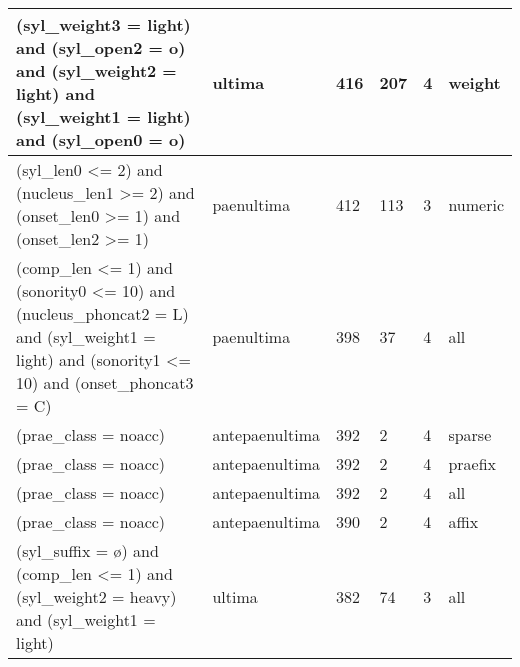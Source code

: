 \begin{table}
\begin{tabular}{|p{8cm}l|ll|ll|}
(syl\_weight3 = light) and (syl\_open2 = o) and (syl\_weight2 = light) and (syl\_weight1 = light) and (syl\_open0 = o)                                                                                                                                      & ultima         & 416 & 207 & 4 & weight    \\\hline
(syl\_len0 \textless= 2) and (nucleus\_len1 \textgreater= 2) and (onset\_len0 \textgreater= 1) and (onset\_len2 \textgreater= 1)                                                                                                                            & paenultima     & 412 & 113 & 3 & numeric   \\\hline
(comp\_len \textless= 1) and (sonority0 \textless= 10) and (nucleus\_phoncat2 = L) and (syl\_weight1 = light) and (sonority1 \textless= 10) and (onset\_phoncat3 = C)                                                                                       & paenultima     & 398 & 37  & 4 & all       \\\hline
(prae\_class = noacc)                                                                                                                                                                                                                                       & antepaenultima & 392 & 2   & 4 & sparse    \\\hline
(prae\_class = noacc)                                                                                                                                                                                                                                       & antepaenultima & 392 & 2   & 4 & praefix   \\\hline
(prae\_class = noacc)                                                                                                                                                                                                                                       & antepaenultima & 392 & 2   & 4 & all       \\\hline
(prae\_class = noacc)                                                                                                                                                                                                                                       & antepaenultima & 390 & 2   & 4 & affix     \\\hline
(syl\_suffix = ø) and (comp\_len \textless= 1) and (syl\_weight2 = heavy) and (syl\_weight1 = light)                                                                                                                                                        & ultima         & 382 & 74  & 3 & all       \\\hline

\end{tabular}
\end{table}
